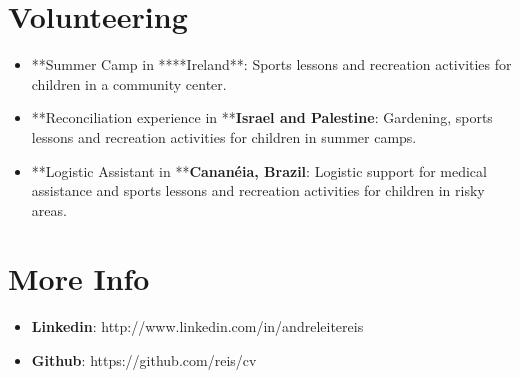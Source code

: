\part{Volunteering}
\label{volunteering}

\begin{itemize}
\item **Summer Camp in ****Ireland**: Sports lessons and recreation activities for children in a community center.

\item **Reconciliation experience in **\textbf{Israel and Palestine}: Gardening, sports lessons and recreation activities for children in summer camps.

\item **Logistic Assistant in **\textbf{Cananéia, Brazil}: Logistic support for medical assistance and sports lessons and recreation activities for children in risky areas.

\end{itemize}

\part{More Info}
\label{moreinfo}

\begin{itemize}
\item \textbf{Linkedin}: http:\slash \slash www.linkedin.com\slash in\slash andreleitereis

\item \textbf{Github}: https:\slash \slash github.com\slash reis\slash cv

\end{itemize}
